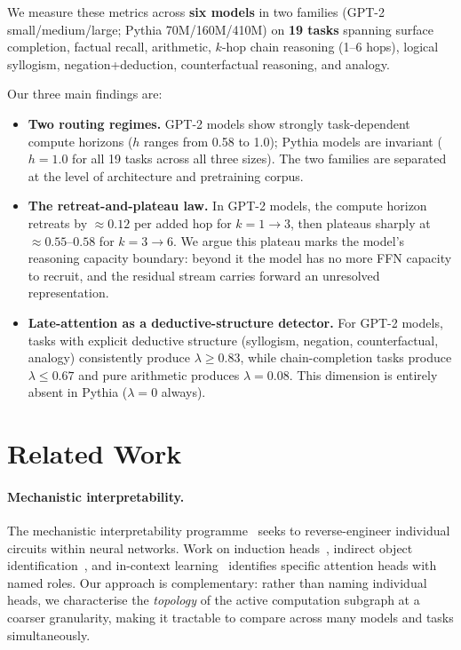 \documentclass{article}
\begin{document}
We measure these metrics across \textbf{six models} in two families
(GPT-2 small/medium/large; Pythia 70M/160M/410M) on \textbf{19 tasks}
spanning surface completion, factual recall, arithmetic, $k$-hop chain
reasoning (1--6 hops), logical syllogism, negation+deduction,
counterfactual reasoning, and analogy.

Our three main findings are:

\begin{itemize}
  \item \textbf{Two routing regimes.} GPT-2 models show strongly
    task-dependent compute horizons ($h$ ranges from 0.58 to 1.0);
    Pythia models are invariant ($h = 1.0$ for all 19 tasks across all
    three sizes). The two families are separated at the level of
    architecture and pretraining corpus.
  \item \textbf{The retreat-and-plateau law.} In GPT-2 models, the
    compute horizon retreats by $\approx 0.12$ per added hop for
    $k\!=\!1\!\to\!3$, then plateaus sharply at $\approx 0.55\text{--}0.58$
    for $k\!=\!3\!\to\!6$. We argue this plateau marks the model's
    reasoning capacity boundary: beyond it the model has no more FFN
    capacity to recruit, and the residual stream carries forward an
    unresolved representation.
  \item \textbf{Late-attention as a deductive-structure detector.}
    For GPT-2 models, tasks with explicit deductive structure
    (syllogism, negation, counterfactual, analogy) consistently produce
    $\lambda \geq 0.83$, while chain-completion tasks produce
    $\lambda \leq 0.67$ and pure arithmetic produces $\lambda = 0.08$.
    This dimension is entirely absent in Pythia ($\lambda = 0$ always).
\end{itemize}


\section{Related Work}

\paragraph{Mechanistic interpretability.}
The mechanistic interpretability programme~\citep{elhage2021mathematical,
olah2020zoom} seeks to reverse-engineer individual circuits within neural
networks.
Work on induction heads~\citep{olsson2022context}, indirect object
identification~\citep{wang2022interpretability}, and in-context
learning~\citep{elhage2021mathematical} identifies specific attention
heads with named roles.
Our approach is complementary: rather than naming individual heads, we
characterise the \emph{topology} of the active computation subgraph at
a coarser granularity, making it tractable to compare across many
models and tasks simultaneously.
\end{document}
